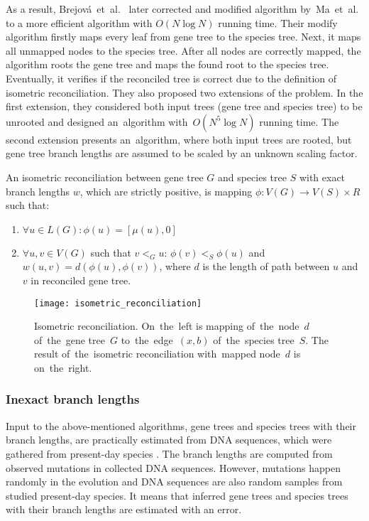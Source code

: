 As a result, Brejová~et~al.~\cite{brejova} later corrected and modified algorithm by~Ma~et~al. to a more efficient algorithm with $O(N \log N)$ running time. Their modify algorithm firstly maps every leaf from gene tree to the species tree. Next, it maps all unmapped nodes to the species tree. After all nodes are correctly mapped, the algorithm roots the gene tree and maps the found root to the species tree. Eventually, it verifies if the reconciled tree is correct due to the definition of isometric reconciliation. They also proposed two extensions of the problem. In the first extension, they considered both input trees (gene tree and species tree) to be unrooted and designed an~algorithm with~$O(N^5 \log N)$ running time. The second extension presents an~algorithm, where both input trees are rooted, but gene tree branch lengths are assumed to be scaled by an unknown scaling factor.

\begin{definition}
An isometric reconciliation between gene tree $G$ and species tree $S$ with exact branch lengths $w$, which are strictly positive, is mapping $\phi: V(G) \rightarrow V(S) \times R$ such that:
	\begin{enumerate}\itemsep0em
	\item $\forall u \in L(G): \phi(u) = [\mu(u), 0]$
	\item $\forall u, v \in V(G)$ such that $v<_Gu$: $\phi(v)<_S\phi(u)$ and $w(u, v) = d(\phi(u), \phi(v))$, where $d$ is the length of path between $u$ and $v$ in reconciled gene tree.
	\end{enumerate}
\end{definition}

\begin{figure}[ht]
	\centering
	\label{isometric_reconciliation}
  	\texttt{[image: isometric\_reconciliation]}
  	\caption[Isometric reconciliation]{Isometric reconciliation. On~the~left is mapping of~the~node~$d$ of~the~gene tree~$G$ to~the~edge~$(x, b)$ of~the~species tree~$S$. The result of~the~isometric reconciliation with~mapped node~$d$ is on~the~right.}
\end{figure}

\subsubsection{Inexact branch lengths} \label{Inexact_branch_lengths}

Input to the above-mentioned algorithms, gene trees and species trees with their branch lengths, are practically estimated from DNA sequences, which were gathered from present-day species \cite{felsenstein}. The branch lengths are computed from observed mutations in collected DNA sequences. However, mutations happen randomly in the evolution and DNA sequences are also random samples from studied present-day species. It means that inferred gene trees and species trees with their branch lengths are estimated with an error.

